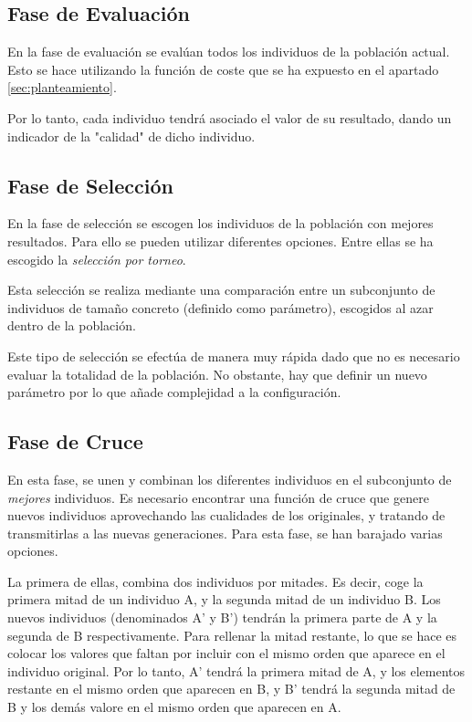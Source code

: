 \documentclass[10pt,a4paper]{article}
\begin{document}
\subsection{Fase de Evaluación}
En la fase de evaluación se evalúan todos los individuos de la población actual. Esto se hace utilizando la función de coste que se ha expuesto en el apartado \ref{sec:planteamiento}.

Por lo tanto, cada individuo tendrá asociado el valor de su resultado, dando un indicador de la "calidad" de dicho individuo.

\subsection{Fase de Selección}
En la fase de selección se escogen los individuos de la población con mejores resultados. 
Para ello se pueden utilizar diferentes opciones. Entre ellas se ha escogido la \textit{selección por torneo}. 

Esta selección se realiza mediante una comparación entre un subconjunto de individuos de tamaño concreto (definido como parámetro), escogidos al azar dentro de la población.

Este tipo de selección se efectúa de manera muy rápida dado que no es necesario evaluar la totalidad de la población. No obstante, hay que definir un nuevo parámetro por lo que añade complejidad a la configuración.

\subsection{Fase de Cruce}
En esta fase, se unen y combinan los diferentes individuos en el subconjunto de \textit{mejores} individuos. Es necesario encontrar una función de cruce que genere nuevos individuos aprovechando las cualidades de los originales, y tratando de transmitirlas a las nuevas generaciones. Para esta fase, se han barajado varias opciones. 

La primera de ellas, combina dos individuos por mitades. Es decir, coge la primera mitad de un individuo A, y la segunda mitad de un individuo B. Los nuevos individuos (denominados A' y B') tendrán la primera parte de A y la segunda de B respectivamente. Para rellenar la mitad restante, lo que se hace es colocar los valores que faltan por incluir con el mismo orden que aparece en el individuo original. Por lo tanto, A' tendrá la primera mitad de A, y los elementos restante en el mismo orden que aparecen en B, y B' tendrá la segunda mitad de B y los demás valore en el mismo orden que aparecen en A.
\end{document}
